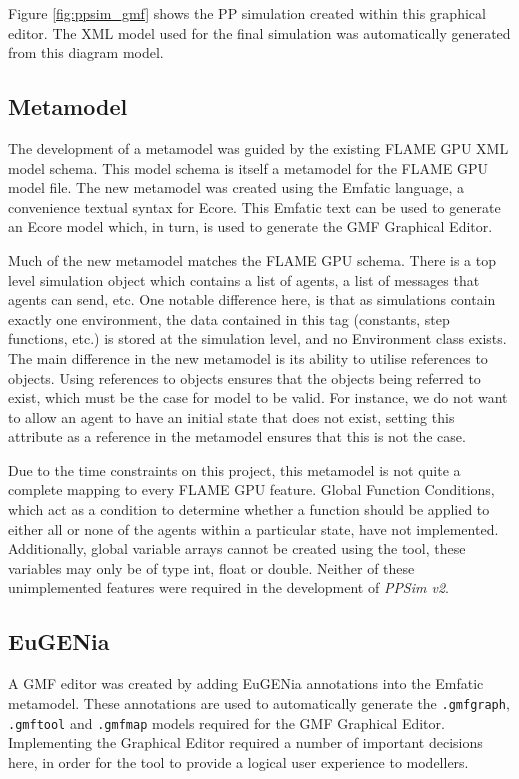 \documentclass{UoYCSproject}
\begin{document}
Figure \ref{fig:ppsim_gmf} shows the \gls{PP} simulation created within this graphical editor.
The XML model used for the final simulation was automatically generated from this diagram model.

\subsection{Metamodel}
The development of a metamodel was guided by the existing \gls{FLAME GPU} XML model schema.
This model schema is itself a metamodel for the \gls{FLAME GPU} model file.
The new metamodel was created using the Emfatic language, a convenience textual syntax for Ecore.
This Emfatic text can be used to generate an Ecore model which, in turn, is used to generate the GMF Graphical Editor.

Much of the new metamodel matches the \gls{FLAME GPU} schema.
There is a top level simulation object which contains a list of agents, a list of messages that agents can send, etc.
One notable difference here, is that as simulations contain exactly one environment, the data contained in this tag (constants, step functions, etc.) is stored at the simulation level, and no Environment class exists.
The main difference in the new metamodel is its ability to utilise references to objects.
Using references to objects ensures that the objects being referred to exist, which must be the case for model to be valid.
For instance, we do not want to allow an agent to have an initial state that does not exist, setting this attribute as a reference in the metamodel ensures that this is not the case.

Due to the time constraints on this project, this metamodel is not quite a complete mapping to every \gls{FLAME GPU} feature.
Global Function Conditions, which act as a condition to determine whether a function should be applied to either all or none of the agents within a particular state, have not implemented.
Additionally, global variable arrays cannot be created using the tool, these variables may only be of type int, float or double.
Neither of these unimplemented features were required in the development of \textit{PPSim v2}.

\subsection{EuGENia}
A GMF editor was created by adding EuGENia annotations into the Emfatic metamodel.
These annotations are used to automatically generate the \texttt{.gmfgraph}, \texttt{.gmftool} and \texttt{.gmfmap} models required for the GMF Graphical Editor.
Implementing the Graphical Editor required a number of important decisions here, in order for the tool to provide a logical user experience to modellers.
\end{document}
